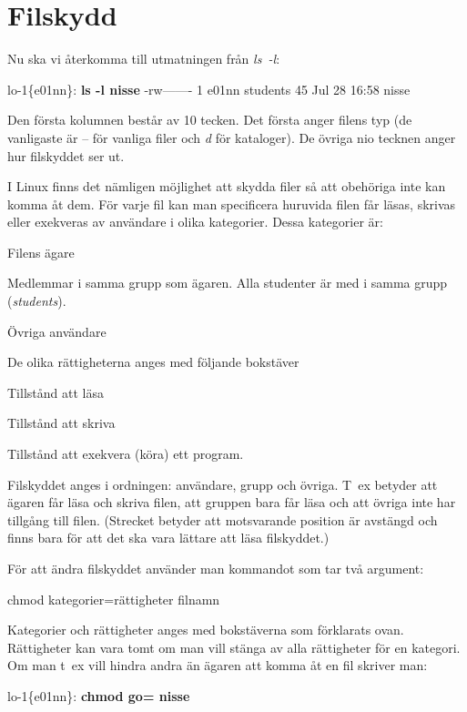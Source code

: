 \documentclass[a4paper,twocolumn]{book}
\begin{document}
\section{Filskydd}

\label{sec:filskydd}
Nu ska vi återkomma till utmatningen från \emph{ls~-l}:
\begin{example}
\scriptsize
lo-1\{e01nn\}: \textbf{ls -l nisse}
-rw-------   1 e01nn  students  45  Jul 28 16:58 nisse
\end{example}
Den första kolumnen består av 10 tecken. Det första anger filens typ
(de vanligaste är -- för vanliga filer och \emph{d} för kataloger). De
övriga nio tecknen anger hur filskyddet ser ut.

I Linux finns det nämligen möjlighet att skydda filer så att
obehöriga inte kan komma åt dem. För varje fil kan man specificera
huruvida filen får läsas, skrivas eller exekveras av användare i olika
kategorier. Dessa kategorier är:
\begin{description}
\samepage
\item[u (user)] Filens ägare
\item[g (group)] Medlemmar i samma grupp som ägaren. Alla studenter
  är med i samma grupp (\emph{students}).
\item[o (others)] Övriga användare
\end{description}
De olika rättigheterna anges med följande bokstäver
\begin{description}
\samepage
\item[r (read)] Tillstånd att läsa
\item[w (write)] Tillstånd att skriva 
\item[x (execute)] Tillstånd att exekvera (köra) ett program.
\end{description}

Filskyddet anges i ordningen: användare, grupp och övriga. T~ex
betyder  att ägaren får läsa och skriva filen, att
gruppen bara får läsa och att övriga inte har tillgång till filen.
(Strecket betyder att motsvarande position är avstängd och finns bara
för att det ska vara lättare att läsa filskyddet.)

För att ändra filskyddet använder man kommandot  som
tar två argument:
\begin{ttquote}
  chmod kategorier=rättigheter filnamn
\end{ttquote}
Kategorier och rättigheter anges med bokstäverna som förklarats
ovan. Rättigheter kan vara tomt om man vill stänga av alla rättigheter
för en kategori. Om man t~ex vill hindra andra än ägaren att komma åt
en fil skriver man:
\begin{example}
lo-1\{e01nn\}: \textbf{chmod go= nisse}
\end{example}
\end{document}
